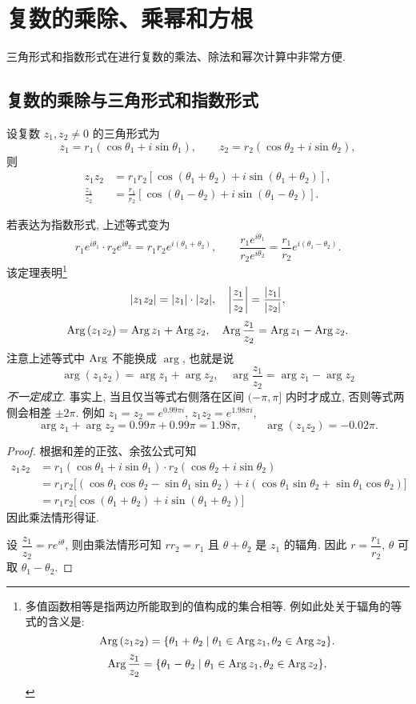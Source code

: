 \section{复数的乘除、乘幂和方根}

三角形式和指数形式在进行复数的乘法、除法和幂次计算中非常方便.
\subsection{复数的乘除与三角形式和指数形式}

\begin{theorem}
\label{thm:multiply}
  设复数 $z_1,z_2\neq0$ 的三角形式为
  \[z_1=r_1(\cos\theta_1+i\sin\theta_1),\qquad
    z_2=r_2(\cos\theta_2+i\sin\theta_2),\]
  则
  \begin{align*}
    z_1z_2&=r_1r_2[\cos(\theta_1+\theta_2)+i\sin(\theta_1+\theta_2)],\\
    \frac{z_1}{z_2}&=\frac{r_1}{r_2}[\cos(\theta_1-\theta_2)+i\sin(\theta_1-\theta_2)].
  \end{align*}
\end{theorem}

若表达为指数形式, 上述等式变为
  \[
  r_1e^{i\theta_1}\cdot r_2e^{i\theta_2}=r_1r_2e^{i(\theta_1+\theta_2)},\qquad
  \frac{r_1e^{i\theta_1}}{r_2e^{i\theta_2}}=\frac{r_1}{r_2}e^{i(\theta_1-\theta_2)}.
  \]
该定理表明\footnote{多值函数相等是指两边所能取到的值构成的集合相等.
例如此处关于辐角的等式的含义是:
  \[\operatorname{Arg}{(z_1z_2)}=\{\theta_1+\theta_2\mid\theta_1\in\operatorname{Arg} z_1,\theta_2\in\operatorname{Arg} z_2\}.\]
  \[\operatorname{Arg}{\frac{z_1}{z_2}}=\{\theta_1-\theta_2\mid\theta_1\in\operatorname{Arg} z_1,\theta_2\in\operatorname{Arg} z_2\}.\]
}
  \[|z_1z_2|=|z_1|\cdot|z_2|,\quad\left|\frac{z_1}{z_2}\right|=\frac{|z_1|}{|z_2|},\]
  \[\operatorname{Arg}{(z_1z_2)}=\operatorname{Arg} z_1+\operatorname{Arg} z_2,\quad
  \operatorname{Arg}{\frac{z_1}{z_2}}=\operatorname{Arg} z_1-\operatorname{Arg} z_2.\]
注意上述等式中 $\operatorname{Arg}$ 不能换成 $\arg$, 也就是说
  \[\arg{(z_1z_2)}=\arg z_1+\arg z_2,\quad
  \arg{\frac{z_1}{z_2}}=\arg z_1-\arg z_2\]
\emph{不一定成立}.
事实上, 当且仅当等式右侧落在区间 $(-\pi,\pi]$ 内时才成立, 否则等式两侧会相差 $\pm2\pi$.
例如 $z_1=z_2=e^{0.99\pi i}$, $z_1z_2=e^{1.98\pi i}$,
\[\arg z_1+\arg z_2=0.99\pi+0.99\pi=1.98\pi,\qquad
\arg(z_1z_2)=-0.02\pi.\]

\begin{proof}
  根据和差的正弦、余弦公式可知
  \begin{align*}
    z_1z_2&=r_1(\cos\theta_1+i\sin\theta_1)\cdot
    r_2(\cos\theta_2+i\sin\theta_2)\\
    &{=r_1r_2\bigl[(\cos\theta_1\cos\theta_2-\sin\theta_1\sin\theta_2)
    +i(\cos\theta_1\sin\theta_2+\sin\theta_1\cos\theta_2)\bigr]}\\
    &{=r_1r_2\bigl[\cos(\theta_1+\theta_2)+i\sin(\theta_1+\theta_2)\bigr]}
  \end{align*}
  因此乘法情形得证.

  设 $\dfrac{z_1}{z_2}=re^{i\theta}$, 则由乘法情形可知 $rr_2=r_1$ 且 $\theta+\theta_2$ 是 $z_1$ 的辐角.
  因此 $r=\dfrac{r_1}{r_2}$, $\theta$ 可取 $\theta_1-\theta_2$.
\end{proof}


